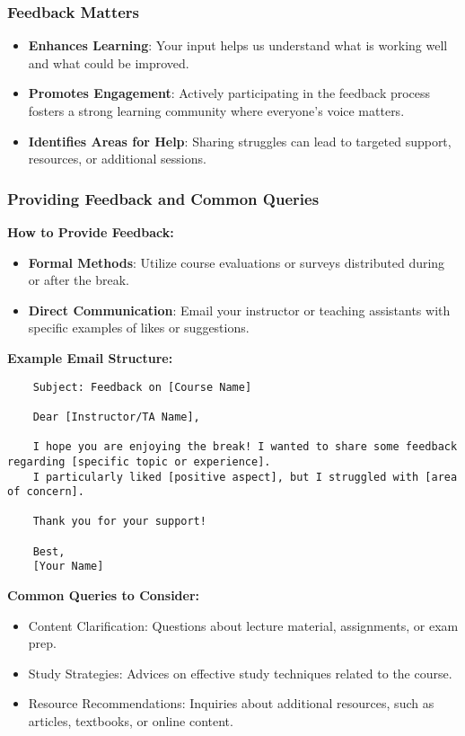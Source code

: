 \documentclass[aspectratio=169]{beamer}
\begin{document}
\begin{frame}[fragile]
    \frametitle{Feedback Matters}
    \begin{itemize}
        \item \textbf{Enhances Learning}: Your input helps us understand what is working well and what could be improved.
        \item \textbf{Promotes Engagement}: Actively participating in the feedback process fosters a strong learning community where everyone's voice matters.
        \item \textbf{Identifies Areas for Help}: Sharing struggles can lead to targeted support, resources, or additional sessions.
    \end{itemize}
\end{frame}

\begin{frame}[fragile]
    \frametitle{Providing Feedback and Common Queries}
    \textbf{How to Provide Feedback:}
    \begin{itemize}
        \item \textbf{Formal Methods}: Utilize course evaluations or surveys distributed during or after the break.
        \item \textbf{Direct Communication}: Email your instructor or teaching assistants with specific examples of likes or suggestions.
    \end{itemize}

    \textbf{Example Email Structure:}
    \begin{lstlisting}
    Subject: Feedback on [Course Name]

    Dear [Instructor/TA Name],

    I hope you are enjoying the break! I wanted to share some feedback regarding [specific topic or experience]. 
    I particularly liked [positive aspect], but I struggled with [area of concern]. 

    Thank you for your support!

    Best,
    [Your Name]
    \end{lstlisting}

    \textbf{Common Queries to Consider:}
    \begin{itemize}
        \item Content Clarification: Questions about lecture material, assignments, or exam prep.
        \item Study Strategies: Advices on effective study techniques related to the course.
        \item Resource Recommendations: Inquiries about additional resources, such as articles, textbooks, or online content.
    \end{itemize}
\end{frame}
\end{document}
